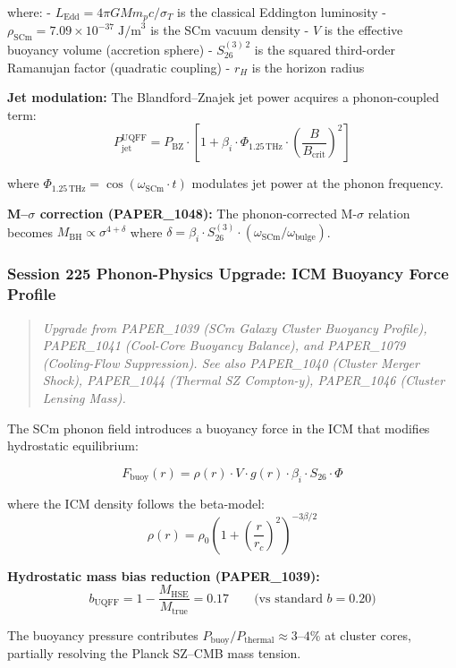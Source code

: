 \documentclass[
  11pt,
]{article}
\begin{document}
where: - $L_{\text{Edd}} = 4\pi G M m_p c / \sigma_T$ is the classical
Eddington luminosity -
$\rho_{\text{SCm}} = 7.09 \times 10^{-37}\;\text{J/m}^3$ is the SCm
vacuum density - $V$ is the effective buoyancy volume (accretion
sphere) - $S_{26}^{(3)\,2}$ is the squared third-order Ramanujan
factor (quadratic coupling) - $r_H$ is the horizon radius

\textbf{Jet modulation:} The Blandford--Znajek jet power acquires a
phonon-coupled term:
\[P_{\text{jet}}^{\text{UQFF}} = P_{\text{BZ}} \cdot \left[1 + \beta_i \cdot \Phi_{1.25\,\text{THz}} \cdot \left(\frac{B}{B_{\text{crit}}}\right)^2\right]\]

where $\Phi_{1.25\,\text{THz}} = \cos(\omega_{\text{SCm}} \cdot t)$
modulates jet power at the phonon frequency.

\textbf{M--$\sigma$ correction (PAPER\_1048):} The phonon-corrected
M-$\sigma$ relation becomes
$M_{\text{BH}} \propto \sigma^{4+\delta}$ where
$\delta = \beta_i \cdot S_{26}^{(3)} \cdot (\omega_{\text{SCm}}/\omega_{\text{bulge}})$.

\subsubsection{Session 225 Phonon-Physics Upgrade: ICM Buoyancy Force
Profile}\label{session-225-phonon-physics-upgrade-icm-buoyancy-force-profile}

\begin{quote}
\emph{Upgrade from PAPER\_1039 (SCm Galaxy Cluster Buoyancy Profile),
PAPER\_1041 (Cool-Core Buoyancy Balance), and PAPER\_1079 (Cooling-Flow
Suppression). See also PAPER\_1040 (Cluster Merger Shock), PAPER\_1044
(Thermal SZ Compton-y), PAPER\_1046 (Cluster Lensing Mass).}
\end{quote}

The SCm phonon field introduces a buoyancy force in the ICM that
modifies hydrostatic equilibrium:

\[F_{\text{buoy}}(r) = \rho(r) \cdot V \cdot g(r) \cdot \beta_i \cdot S_{26} \cdot \Phi\]

where the ICM density follows the beta-model:
\[\rho(r) = \rho_0 \left(1 + \left(\frac{r}{r_c}\right)^2\right)^{-3\beta/2}\]

\textbf{Hydrostatic mass bias reduction (PAPER\_1039):}
\[b_{\text{UQFF}} = 1 - \frac{M_{\text{HSE}}}{M_{\text{true}}} = 0.17 \qquad \text{(vs standard } b = 0.20\text{)}\]

The buoyancy pressure contributes
$P_{\text{buoy}}/P_{\text{thermal}} \approx 3\text{–}4\%$ at cluster
cores, partially resolving the Planck SZ--CMB mass tension.
\end{document}
